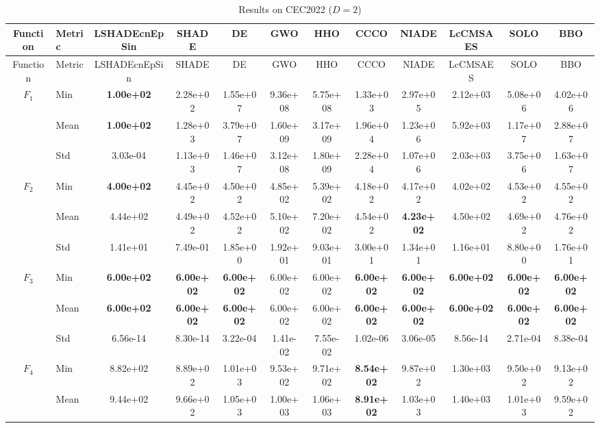 \begin{center}
\small
\renewcommand{\arraystretch}{1.25}
\begin{longtable}{clcccccccccc}
\caption{Results on CEC2022 ($D=2$) }
\label{tab:results_CEC2022_2} \\
\toprule
Function & Metric & LSHADEcnEpSin & SHADE & DE & GWO & HHO & CCCO & NIADE & LcCMSAES & SOLO & BBO \\
\midrule
\endfirsthead
\toprule
Function & Metric & LSHADEcnEpSin & SHADE & DE & GWO & HHO & CCCO & NIADE & LcCMSAES & SOLO & BBO \\
\midrule
\endhead
\multirow{3}{*}{$F_{1}$} & Min & \textbf{1.00e+02} & 2.28e+02 & 1.55e+07 & 9.36e+08 & 5.75e+08 & 1.33e+03 & 2.97e+05 & 2.12e+03 & 5.08e+06 & 4.02e+06 \\
 & Mean & \textbf{1.00e+02} & 1.28e+03 & 3.79e+07 & 1.60e+09 & 3.17e+09 & 1.96e+04 & 1.23e+06 & 5.92e+03 & 1.17e+07 & 2.88e+07 \\
 & Std & 3.03e-04 & 1.13e+03 & 1.46e+07 & 3.12e+08 & 1.80e+09 & 2.28e+04 & 1.07e+06 & 2.03e+03 & 3.75e+06 & 1.63e+07 \\
\midrule
\multirow{3}{*}{$F_{2}$} & Min & \textbf{4.00e+02} & 4.45e+02 & 4.50e+02 & 4.85e+02 & 5.39e+02 & 4.18e+02 & 4.17e+02 & 4.02e+02 & 4.53e+02 & 4.55e+02 \\
 & Mean & 4.44e+02 & 4.49e+02 & 4.52e+02 & 5.10e+02 & 7.20e+02 & 4.54e+02 & \textbf{4.23e+02} & 4.50e+02 & 4.69e+02 & 4.76e+02 \\
 & Std & 1.41e+01 & 7.49e-01 & 1.85e+00 & 1.92e+01 & 9.03e+01 & 3.00e+01 & 1.34e+01 & 1.16e+01 & 8.80e+00 & 1.76e+01 \\
\midrule
\multirow{3}{*}{$F_{3}$} & Min & \textbf{6.00e+02} & \textbf{6.00e+02} & \textbf{6.00e+02} & 6.00e+02 & 6.00e+02 & \textbf{6.00e+02} & \textbf{6.00e+02} & \textbf{6.00e+02} & \textbf{6.00e+02} & \textbf{6.00e+02} \\
 & Mean & \textbf{6.00e+02} & \textbf{6.00e+02} & \textbf{6.00e+02} & 6.00e+02 & 6.00e+02 & \textbf{6.00e+02} & \textbf{6.00e+02} & \textbf{6.00e+02} & \textbf{6.00e+02} & \textbf{6.00e+02} \\
 & Std & 6.56e-14 & 8.30e-14 & 3.22e-04 & 1.41e-02 & 7.55e-02 & 1.02e-06 & 3.06e-05 & 8.56e-14 & 2.71e-04 & 8.38e-04 \\
\midrule
\multirow{3}{*}{$F_{4}$} & Min & 8.82e+02 & 8.89e+02 & 1.01e+03 & 9.53e+02 & 9.71e+02 & \textbf{8.54e+02} & 9.87e+02 & 1.30e+03 & 9.50e+02 & 9.13e+02 \\
 & Mean & 9.44e+02 & 9.66e+02 & 1.05e+03 & 1.00e+03 & 1.06e+03 & \textbf{8.91e+02} & 1.03e+03 & 1.40e+03 & 1.01e+03 & 9.59e+02 \\

\end{longtable}
\end{center}
